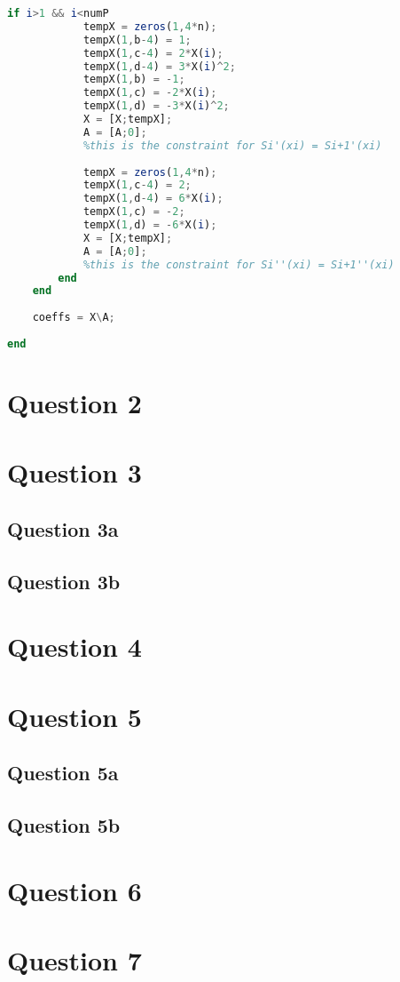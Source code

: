\documentclass[11pt]{article} %
\begin{document}
\begin{lstlisting}[language=Octave]
        if i>1 && i<numP
            tempX = zeros(1,4*n);
            tempX(1,b-4) = 1;
            tempX(1,c-4) = 2*X(i);
            tempX(1,d-4) = 3*X(i)^2;
            tempX(1,b) = -1;
            tempX(1,c) = -2*X(i);
            tempX(1,d) = -3*X(i)^2;
            X = [X;tempX];
            A = [A;0];
            %this is the constraint for Si'(xi) = Si+1'(xi)
            
            tempX = zeros(1,4*n);
            tempX(1,c-4) = 2;
            tempX(1,d-4) = 6*X(i);
            tempX(1,c) = -2;
            tempX(1,d) = -6*X(i);
            X = [X;tempX];
            A = [A;0];
            %this is the constraint for Si''(xi) = Si+1''(xi)
        end
    end
    
    coeffs = X\A;
    
end
\end{lstlisting}

\section{Question 2}
\section{Question 3}
\subsection{Question 3a}
\subsection{Question 3b}

\section{Question 4}
\section{Question 5}
\subsection{Question 5a}
\subsection{Question 5b}

\section{Question 6}
\section{Question 7}
\end{document}
